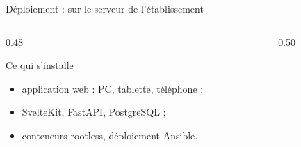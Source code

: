 \begin{frame}{Déploiement : sur le serveur de l'établissement}
  \footnotesize
  \begin{columns}[T,onlytextwidth]
    \begin{column}{0.48\textwidth}
      \begin{block}{Ce qui s'installe}
        \begin{itemize}
          \item application web : PC, tablette, téléphone ;
          \item SvelteKit, FastAPI, PostgreSQL ;
          \item conteneurs rootless, déploiement Ansible.
        \end{itemize}
      \end{block}
    \end{column}

    \begin{column}{0.50\textwidth}
    \end{column}
  \end{columns}
\end{frame}

